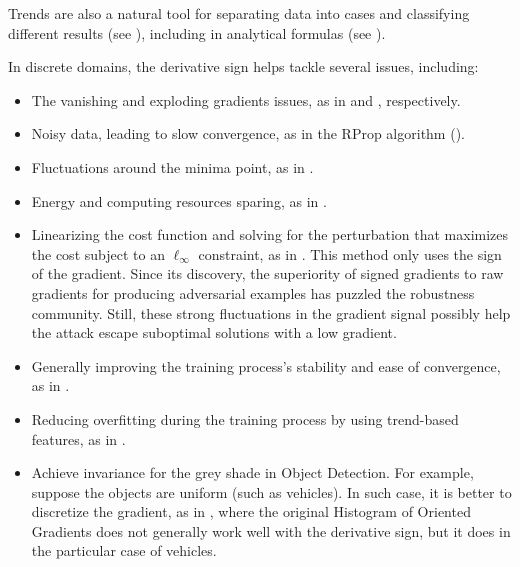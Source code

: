 \documentclass[11pt]{book}
\begin{document}
Trends are also a natural tool for separating data into cases and classifying
different results (see \cite{de2000infrared,dash2003fuzzy,herdaugdelen2004dynamic,hahkioniemi2008durability,arino2010effect,ruiz2014unusual,moussi2015nonlinear,chu2016single,dong2018accurate,dong2018fast}),
including in analytical formulas (see \cite{morel1996precise,dimova2000numerical,ryu2001nonlinear,chen2014dual,yuan2016new,lima2016stochastic,ruderman2017break,choi2017tension,ismail2017passive,chen2018global,wang2018bifurcation,li2018bifurcation,dong2019friction,alaci2020proposed,capace2021modelling,hanisch2021rolling,odabacs2021adaptive}).

In discrete domains, the derivative sign helps tackle several issues, including:
\begin{itemize}
\item The vanishing and exploding gradients issues, as in \cite{abuqaddom2021oriented}
and \cite{ravi2016optimization}, respectively.
\item Noisy data, leading to slow convergence, as in the RProp algorithm
(\cite{riedmiller1993direct}).
\item Fluctuations around the minima point, as in \cite{wang2019spi}.
\item Energy and computing resources sparing, as in \cite{hubara2017quantized}.
\item Linearizing the cost function and solving for the perturbation that
maximizes the cost subject to an $\ell_{\infty}$ constraint, as in
\cite{goodfellow2014explaining}. This method only uses the sign of
the gradient. Since its discovery, the superiority of signed gradients
to raw gradients for producing adversarial examples has puzzled the
robustness community. Still, these strong fluctuations in the gradient
signal possibly help the attack escape suboptimal solutions with a
low gradient.
\item Generally improving the training process's stability and ease of convergence,
as in \cite{li2018a2}.
\item Reducing overfitting during the training process by using trend-based
features, as in \cite{wulsin2011modeling}.
\item Achieve invariance for the grey shade in Object Detection. For
example, suppose the objects are uniform (such as vehicles). In such
case, it is better to discretize the gradient, as in \cite{arrospide2013image},
where the original Histogram of Oriented Gradients does not generally work well with the derivative
sign, but it does in the particular case of vehicles. \cite{ojala2002multiresolution}

\end{itemize}
\end{document}
